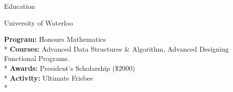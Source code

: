 \documentclass{article}
\newlength{\tabin}
\newlength{\secsep}
\newcommand{\lineunder}{\vspace*{-8pt} \\ \hspace*{-6pt} \hrulefill \\ \vspace*{-15pt}}
\newenvironment{tabbedsection}[1]{
  \begin{list}{}{
      \setlength{\itemsep}{0pt}
      \setlength{\labelsep}{0pt}
      \setlength{\labelwidth}{0pt}
      \setlength{\leftmargin}{\tabin}
      \setlength{\rightmargin}{\tabin}
      \setlength{\listparindent}{0pt}
      \setlength{\parsep}{0pt}
      \setlength{\parskip}{0pt}
      \setlength{\partopsep}{0pt}
      \setlength{\topsep}{#1}
    }
  \item[]
}{\end{list}}
\newenvironment{nospacetabbing}{
    \begin{tabbing}
}{\end{tabbing}\vspace{-1.2em}}
\newenvironment{resume_section}[1]{
  \filbreak
  \vspace{2\secsep}
  \textsc{\large#1}
  \lineunder
  \begin{tabbedsection}{\secsep}
}{\end{tabbedsection}}
\newenvironment{resume_subsection}[2][]{
  \textbf{#2} \hfill {\footnotesize #1} \hspace{-5.1em}
  \begin{tabbedsection}{0.5\secsep}
}{\end{tabbedsection}}
\begin{document}
\begin{resume_section}{Education}
  \begin{resume_subsection}[07/2022 - Present]{University of Waterloo}
    \begin{nospacetabbing}
      \textbf{Program:} \= Honours Mathematics \\*
      \textbf{Courses:} \>Advanced Data Structures \& Algorithm, Advanced Designing Functional Programs. \\*
      \textbf{Awards:} \> President's Scholarship (\$2000) \\*
      \textbf{Activity:} \>Ultimate Frisbee \\*
    \end{nospacetabbing}
  \end{resume_subsection}
\end{resume_section}



  
\end{document}
